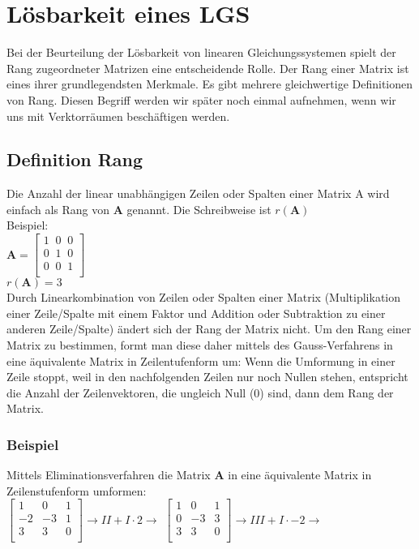 \documentclass[../main.tex]{subfiles}
\begin{document}
\section{Lösbarkeit eines LGS}
Bei der Beurteilung der Lösbarkeit von linearen Gleichungssystemen spielt der Rang
zugeordneter Matrizen eine entscheidende Rolle. Der Rang einer Matrix ist eines ihrer
grundlegendsten Merkmale. Es gibt mehrere gleichwertige Definitionen von Rang. Diesen
Begriff werden wir später noch einmal aufnehmen, wenn wir uns mit Verktorräumen
beschäftigen werden.

\subsection{Definition Rang}
Die Anzahl der linear unabhängigen Zeilen oder Spalten einer Matrix A wird einfach als Rang von $\mathbf{A}$ genannt. 
Die Schreibweise ist $r(\mathbf{A})$ \\
Beispiel: \\ [7pt]
$\mathbf{A}= 
\begin{bmatrix}
    1 \;\; 0 \;\; 0  \\
    0 \;\; 1 \;\; 0  \\
    0 \;\; 0 \;\; 1  \\
\end{bmatrix}$
\\ [7pt]
$r(\mathbf{A})=3$ \\ [7pt]
Durch Linearkombination von Zeilen oder Spalten einer Matrix (Multiplikation einer
Zeile/Spalte mit einem Faktor und Addition oder Subtraktion zu einer anderen Zeile/Spalte)
ändert sich der Rang der Matrix nicht. Um den Rang einer Matrix zu bestimmen, formt man
diese daher mittels des Gauss-Verfahrens in eine äquivalente Matrix in Zeilentufenform um:
Wenn die Umformung in einer Zeile stoppt, weil in den nachfolgenden Zeilen nur noch Nullen
stehen, entspricht die Anzahl der Zeilenvektoren, die ungleich Null (0) sind, dann dem Rang der
Matrix.

\subsubsection{Beispiel}
Mittels Eliminationsverfahren die Matrix $\mathbf{A}$ in eine äquivalente Matrix in Zeilenstufenform umformen: \\ [7pt]

$\begin{bmatrix}
    1 & 0 & 1   \\
    -2 & -3 & 1  \\
    3 & 3 & 0 \\
\end{bmatrix} \rightarrow II + I \cdot 2 \rightarrow$
$\begin{bmatrix}
    1 & 0 & 1   \\
    0 & -3 & 3 \\
    3 & 3 & 0 \\
\end{bmatrix} \rightarrow III + I \cdot -2 \rightarrow$ \\ [7pt]
\end{document}

